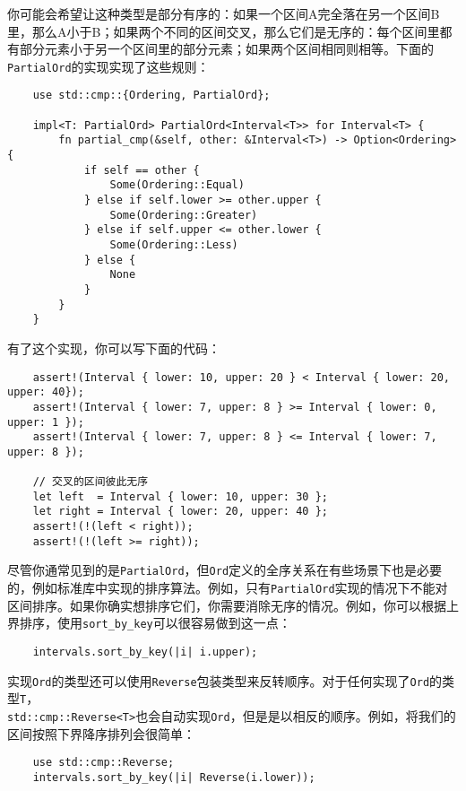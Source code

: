 你可能会希望让这种类型是部分有序的：如果一个区间A完全落在另一个区间B里，那么A小于B；如果两个不同的区间交叉，那么它们是无序的：每个区间里都有部分元素小于另一个区间里的部分元素；如果两个区间相同则相等。下面的\texttt{PartialOrd}的实现实现了这些规则：
\begin{verbatim}
    use std::cmp::{Ordering, PartialOrd};

    impl<T: PartialOrd> PartialOrd<Interval<T>> for Interval<T> {
        fn partial_cmp(&self, other: &Interval<T>) -> Option<Ordering> {
            if self == other {
                Some(Ordering::Equal)
            } else if self.lower >= other.upper {
                Some(Ordering::Greater)
            } else if self.upper <= other.lower {
                Some(Ordering::Less)
            } else {
                None
            }
        }
    }
\end{verbatim}

有了这个实现，你可以写下面的代码：
\begin{verbatim}
    assert!(Interval { lower: 10, upper: 20 } < Interval { lower: 20, upper: 40});
    assert!(Interval { lower: 7, upper: 8 } >= Interval { lower: 0, upper: 1 });
    assert!(Interval { lower: 7, upper: 8 } <= Interval { lower: 7, upper: 8 });

    // 交叉的区间彼此无序
    let left  = Interval { lower: 10, upper: 30 };
    let right = Interval { lower: 20, upper: 40 };
    assert!(!(left < right));
    assert!(!(left >= right));
\end{verbatim}

尽管你通常见到的是\texttt{PartialOrd}，但\texttt{Ord}定义的全序关系在有些场景下也是必要的，例如标准库中实现的排序算法。例如，只有\texttt{PartialOrd}实现的情况下不能对区间排序。如果你确实想排序它们，你需要消除无序的情况。例如，你可以根据上界排序，使用\texttt{sort\_by\_key}可以很容易做到这一点：
\begin{verbatim}
    intervals.sort_by_key(|i| i.upper);
\end{verbatim}

实现\texttt{Ord}的类型还可以使用\texttt{Reverse}包装类型来反转顺序。对于任何实现了\texttt{Ord}的类型\texttt{T}，\\
\texttt{std::cmp::Reverse<T>}也会自动实现\texttt{Ord}，但是是以相反的顺序。例如，将我们的区间按照下界降序排列会很简单：
\begin{verbatim}
    use std::cmp::Reverse;
    intervals.sort_by_key(|i| Reverse(i.lower));
\end{verbatim}


